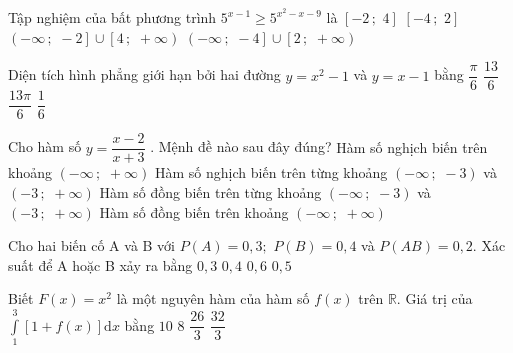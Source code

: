 \begin{ex}%
 Tập nghiệm của bất phương trình $5^{x-1}\ge{5^{x^2-x-9}}$ là
 \choice
 {\True $\left[-2\,;\,\,4\right]$}
 {$\left[-4\,;\,\,2\right]$}
 {$\left(-\infty\,;\,\,-2\right]\cup\left[4\,;\,\,+\infty\right)$}
 {$\left(-\infty\,;\,\,-4\right]\cup\left[2\,;\,\,+\infty\right)$}
\end{ex}

\begin{ex}%
    Diện tích hình phẳng giới hạn bởi hai đường $y = x^2 - 1$ và $y = x - 1$ bằng
    \choice
    {$\dfrac{\pi}{6}$}
    {$\dfrac{13}{6}$}
    {$\dfrac{13\pi}{6}$}
    {\True $\dfrac{1}{6}$}
\end{ex}
%
\begin{ex}%
 Cho hàm số $y=\dfrac{x-2}{x+3}$ . Mệnh đề nào sau đây đúng?
 \choice
 {Hàm số nghịch biến trên khoảng $\left(-\infty\,;\,\,+\infty\right)$}
 {Hàm số nghịch biến trên từng khoảng $\left(-\infty\,;\,\,-3\right)$ và $\left(-3\,;\,\,+\infty\right)$}
 {\True Hàm số đồng biến trên từng khoảng $\left(-\infty\,;\,\,-3\right)$ và $\left(-3\,;\,\,+\infty\right)$}
 {Hàm số đồng biến trên khoảng $\left(-\infty\,;\,\,+\infty\right)$}
\end{ex}

\begin{ex}%
 Cho hai biến cố A và B với $ P(A)=0,3;\,\,P(B)=0,4$ và $ P\left(AB\right)=0,2.$ Xác suất để A hoặc B xảy ra bằng
 \choice
 {$ 0,3$}
 {$ 0,4$}
 {$ 0,6$}
 {\True $ 0,5$}
\end{ex}

\begin{ex}%
 Biết $ F(x)=x^2$ là một nguyên hàm của hàm số $ f(x)$ trên $\mathbb{R}$. Giá trị của $\displaystyle\int\limits_1^3\left[1+f(x)\right]\text{d}x$ bằng
 \choice
 {\True $ 10$}
 {$ 8$}
 {$\dfrac{26}{3}$}
 {$\dfrac{32}{3}$}
 \end{ex}
 
